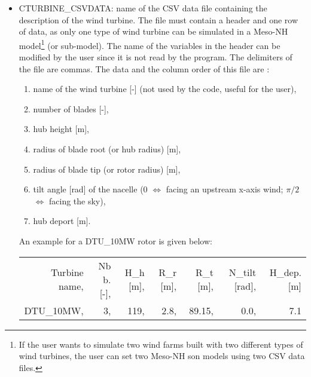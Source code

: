 \begin{itemize}
\item CTURBINE\_CSVDATA: name of the CSV data file containing the description of the wind turbine. The file must contain a header and one row of data, as only one type of wind turbine can be simulated in a Meso-NH model\footnote{If the user wants to simulate two wind farms built with two different types of wind turbines, the user can set two Meso-NH son models using two CSV data files.} (or sub-model). The name of the variables in the header can be modified by the user since it is not read by the program. The delimiters of the file are commas. The data and the column order of this file are : 
\begin{enumerate}
\item name of the wind turbine [-] (not used by the code, useful for the user),
\item number of blades [-],
\item hub height [m],
\item radius of blade root (or hub radius) [m],
\item radius of blade tip (or rotor radius) [m],
\item tilt angle [rad] of the nacelle ($0$ $\Leftrightarrow$ facing an upstream x-axis wind; $\pi/2$ $\Leftrightarrow$ facing the sky),
\item hub deport [m].
\end{enumerate}
An example for a DTU\_10MW rotor is given below:
\begin{center}
\begin{tabular} {|rrrrrrr|}
\hline
Turbine name,& Nb b.[-],& H\_h [m],& R\_r [m],& R\_t [m],& N\_tilt [rad],& H\_dep. [m]\\
DTU\_10MW,& 3,& 119,& 2.8,& 89.15,& 0.0,& 7.1 \\
\hline
\end{tabular}
\end{center}


\end{itemize}
